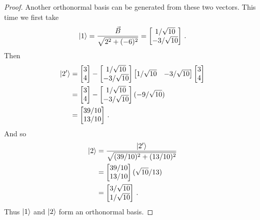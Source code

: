 \begin{proof}
Another orthonormal basis can be generated from these two vectors. This time we first take
\begin{equation}
    \ket{1} = \frac{\vec{B}}{\sqrt{2^2 + (-6)^2}} = 
    \begin{bmatrix}
    1/\sqrt{10} \\
    -3/\sqrt{10}
    \end{bmatrix}\,.
\end{equation}
Then 
\begin{align}
    \ket{2'} &= 
    \begin{bmatrix}
    3 \\
    4
    \end{bmatrix}
    -
    \begin{bmatrix}
    1/\sqrt{10} \\
    -3/\sqrt{10}
    \end{bmatrix}
    \begin{bmatrix}
    1/\sqrt{10} & -3/\sqrt{10}
    \end{bmatrix}
    \begin{bmatrix}
    3 \\
    4
    \end{bmatrix} \\
    &= 
    \begin{bmatrix}
    3 \\
    4
    \end{bmatrix}
    -
    \begin{bmatrix}
    1/\sqrt{10} \\
    -3/\sqrt{10}
    \end{bmatrix}
    (-9/\sqrt{10}) \\
    &= 
    \begin{bmatrix}
    39/10 \\
    13/10
    \end{bmatrix}\,.
\end{align}
And so
\begin{align}
    \ket{2} &= \frac{\ket{2'}}{\sqrt{(39/10)^2 + (13/10)^2}} \\
    &= 
    \begin{bmatrix}
    39/10 \\
    13/10
    \end{bmatrix}
    (\sqrt{10}/13) \\
    &= 
    \begin{bmatrix}
    3/\sqrt{10} \\
    1/\sqrt{10}
    \end{bmatrix}\,.
\end{align}
Thus $\ket{1}$ and $\ket{2}$ form an orthonormal basis.
\end{proof}

